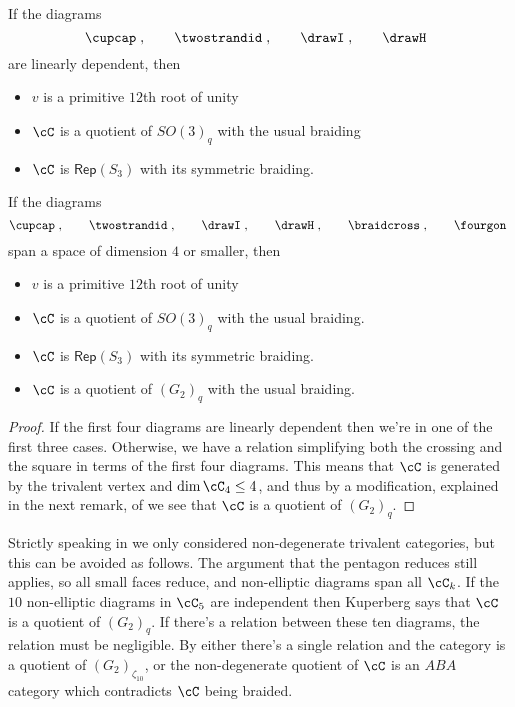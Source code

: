 \documentclass[12pt]{amsart}
\begin{document}
\begin{corollary}
If the diagrams   
  \[
  \cupcap\;,\qquad\twostrandid\;,
    \qquad\drawI\;,\qquad\drawH\;\;
   \]
are linearly dependent, then
\begin{itemize}
\item $v$ is a primitive $12$th root of unity
\item $\cC$ is a quotient of $SO(3)_q$ with the usual braiding
\item $\cC$ is $\mathsf{Rep}(S_3)$ with its symmetric braiding.
\end{itemize}
\end{corollary}


\begin{proposition} \label{prop:dim4}
If the diagrams  
  \[
  \cupcap\;,\qquad\twostrandid\;,
    \qquad\drawI\;,\qquad\drawH\;,\qquad\braidcross\;,\qquad\fourgon\;
   \]
span a space of dimension $4$ or smaller, then
\begin{itemize}
\item $v$ is a primitive $12$th root of unity
\item $\cC$ is a quotient of $SO(3)_q$ with the usual braiding.
\item $\cC$ is $\mathsf{Rep}(S_3)$ with its symmetric braiding.
\item $\cC$ is a quotient of $(G_2)_q$ with the usual braiding.  
\end{itemize}
\end{proposition}
\begin{proof}
If the first four diagrams are linearly dependent then we're in one of the
first three cases.  Otherwise, we have a relation simplifying both the
crossing and the square in terms of the first four diagrams.  This means that
$\cC$ is generated by the trivalent vertex and $\dim \cC_4 \leq 4$, and thus
by a modification, explained in the next remark, of \cite[\S 5]{MR3624901} we see that $\cC$ is a
quotient of $(G_2)_q$.
\end{proof}

\begin{remark}
Strictly speaking in \cite{MR3624901} we only considered non-degenerate trivalent categories, but this can be avoided as follows.  The argument that the pentagon reduces still applies, so all small faces reduce, and non-elliptic diagrams span all $\cC_k$.  If the $10$ non-elliptic diagrams in $\cC_5$ are independent then Kuperberg \cite{MR1265145} says that $\cC$ is a quotient of $(G_2)_q$.  If there's a relation between these ten diagrams, the relation must be negligible.  By \cite{MR3624901} either there's a single relation and the category is a quotient of $(G_2)_{\zeta_{10}}$, or the non-degenerate quotient of $\cC$ is an $ABA$ category which contradicts $\cC$ being braided.
\end{remark}
\end{document}
